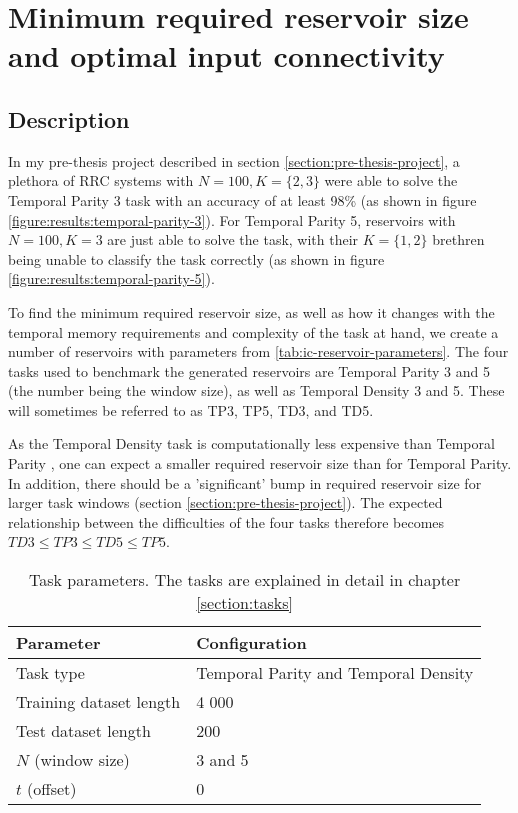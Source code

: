 \section{Minimum required reservoir size and optimal input connectivity}
\label{section:required_reservoir_size}

\subsection{Description}

In my pre-thesis project described in section \ref{section:pre-thesis-project},
a plethora of RRC systems with $N=100, K=\{2, 3\}$ were able to solve the Temporal Parity 3 task with an accuracy of at least 98\% (as shown in figure \ref{figure:results:temporal-parity-3}).
For Temporal Parity 5, reservoirs with $N=100, K=3$ are just able to solve the task,
with their $K=\{1, 2\}$ brethren being unable to classify the task correctly (as shown in figure \ref{figure:results:temporal-parity-5}).

To find the minimum required reservoir size, as well as how it changes with the temporal memory requirements and complexity of the task at hand,
we create a number of reservoirs with parameters from \ref{tab:ic-reservoir-parameters}.
The four tasks used to benchmark the generated reservoirs are Temporal Parity 3 and 5 (the number being the window size),
as well as Temporal Density 3 and 5.
These will sometimes be referred to as TP3, TP5, TD3, and TD5.

As the Temporal Density task is computationally less expensive than Temporal Parity \cite{rbn-reservoir},
one can expect a smaller required reservoir size than for Temporal Parity.
In addition, there should be a 'significant' bump in required reservoir size for larger task windows (section \ref{section:pre-thesis-project}).
The expected relationship between the difficulties of the four tasks therefore becomes $ TD3 \leq TP3 \leq TD5 \leq TP5 $.

\begin{table}[ht]
    \centering
    \caption{Task parameters. The tasks are explained in detail in chapter \ref{section:tasks}}
    \label{tab:tasks}
    \begin{tabular}{ll}
        \hline
        \textbf{Parameter} & \textbf{Configuration} \\
        \hline
        \hline
        Task type               & Temporal Parity and Temporal Density \\
        Training dataset length & 4 000                       \\
        Test dataset length     & 200                         \\
        $N$ (window size)       & 3 and 5                     \\
        $t$ (offset)            & 0 \\
        \hline
    \end{tabular}
\end{table}

